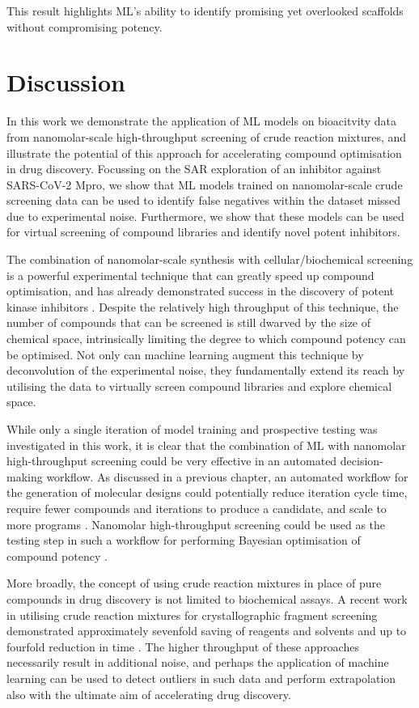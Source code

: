 This result highlights ML's ability to identify promising yet overlooked scaffolds without compromising potency. 

\section{Discussion}

In this work we demonstrate the application of ML models on bioacitvity data from nanomolar-scale high-throughput screening of crude reaction mixtures, and illustrate the potential of this approach for accelerating compound optimisation in drug discovery. Focussing on the SAR exploration of an inhibitor against SARS-CoV-2 Mpro, we show that ML models trained on nanomolar-scale crude screening data can be used to identify false negatives within the dataset missed due to experimental noise. Furthermore, we show that these models can be used for virtual screening of compound libraries and identify novel potent inhibitors.

The combination of nanomolar-scale synthesis with cellular/biochemical screening is a powerful experimental technique that can greatly speed up compound optimisation, and has already demonstrated success in the discovery of potent kinase inhibitors \cite{Gesmundo2018nanosar, Gehrtz2022nanomolar}. Despite the relatively high throughput of this technique, the number of compounds that can be screened is still dwarved by the size of chemical space, intrinsically limiting the degree to which compound potency can be optimised. Not only can machine learning augment this technique by deconvolution of the experimental noise, they fundamentally extend its reach by utilising the data to virtually screen compound libraries and explore chemical space.

While only a single iteration of model training and prospective testing was investigated in this work, it is clear that the combination of ML with nanomolar high-throughput screening could be very effective in an automated decision-making workflow. As discussed in a previous chapter, an automated workflow for the generation of molecular designs could potentially reduce iteration cycle time, require fewer compounds and iterations to produce a candidate, and scale to more programs \cite{Schneider2018AutomatingDrugDiscovery, Coley2020Outlook, Goldman2022ChemicalDesignLevels}. Nanomolar high-throughput screening could be used as the testing step in such a workflow for performing Bayesian optimisation of compound potency \cite{korovina2019chembo}.

More broadly, the concept of using crude reaction mixtures in place of pure compounds in drug discovery is not limited to biochemical assays. A recent work in utilising crude reaction mixtures for crystallographic fragment screening demonstrated approximately sevenfold saving of reagents and solvents and up to fourfold reduction in time \cite{Baker2020FragementsFromCrude}. The higher throughput of these approaches necessarily result in additional noise, and perhaps the application of machine learning can be used to detect outliers in such data and perform extrapolation also with the ultimate aim of accelerating drug discovery.
